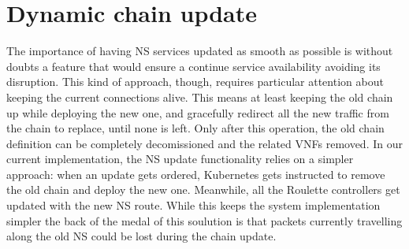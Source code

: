 \section{Dynamic chain update}

The importance of having NS services updated as smooth as possible is without
doubts a feature that would ensure a continue service availability avoiding its
disruption. This kind of approach, though, requires particular attention about
keeping the current connections alive. This means at least keeping the old chain
up while deploying the new one, and gracefully redirect all the new traffic from
the chain to replace, until none is left. Only after this operation, the old
chain definition can be completely decomissioned and the related VNFs removed.
In our current implementation, the NS update functionality relies on a simpler
approach: when an update gets ordered, Kubernetes gets instructed to remove the
old chain and deploy the new one. Meanwhile, all the Roulette controllers get
updated with the new NS route. While this keeps the system implementation
simpler the back of the medal of this soulution is that packets currently
travelling along the old NS could be lost during the chain update.
